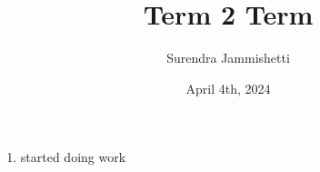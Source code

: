 \documentclass[12pt, letterpaper]{article}
\title{Term 2 Term}
\author{Surendra Jammishetti}
\date{April 4th, 2024}
\begin{document}
\maketitle
\begin{sloppypar}

    \begin{enumerate}
        \item started doing work
    \end{enumerate}

\end{sloppypar}
\end{document}
